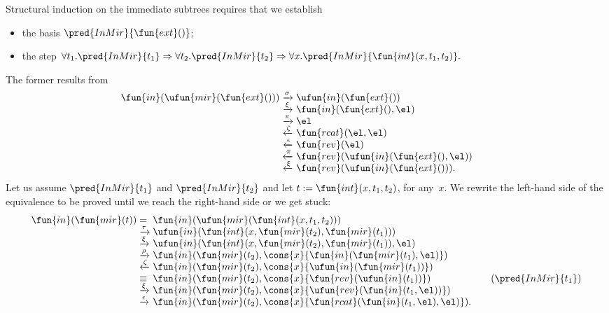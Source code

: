 \noindent Structural induction on the immediate subtrees requires that
we establish
\begin{itemize}

  \item the basis
  \(\pred{InMir}{\fun{ext}()}\);

  \item the step \(\forall t_1.\pred{InMir}{t_1} \Rightarrow \forall
    t_2.\pred{InMir}{t_2} \Rightarrow \forall
    x.\pred{InMir}{\fun{int}(x,t_1,t_2)}.\)

\end{itemize}
The former results from
\begin{equation*}
\begin{array}{@{}r@{\;}c@{\;}l@{\qquad}}
  \fun{in}(\ufun{mir}(\fun{ext}()))
  & \xrightarrow{\smash{\sigma}}
  & \ufun{in}(\fun{ext}())\\
  & \xrightarrow{\smash{\xi}}
  & \fun{in}(\fun{ext}(),\el)\\
  & \xrightarrow{\smash{\pi}}
  & \el\\
  & \xleftarrow{\smash{\zeta}}
  & \fun{rcat}(\el,\el)\\
  & \xleftarrow{\smash{\epsilon}}
  & \fun{rev}(\el)\\
  & \xleftarrow{\smash{\pi}}
  & \fun{rev}(\ufun{in}(\fun{ext}(),\el))\\
  & \xleftarrow{\smash{\xi}}
  & \fun{rev}(\ufun{in}(\fun{ext}())).
  \index{rcat@\fun{rcat/2}}\index{rev@\fun{rev/1}}
\end{array}
\end{equation*}
Let us assume \(\pred{InMir}{t_1}\) and \(\pred{InMir}{t_2}\) and let
\(t := \fun{int}(x,t_1,t_2)\), for any~\(x\). We rewrite the
left\hyp{}hand side of the equivalence to be proved until we reach the
right\hyp{}hand side or we get stuck:
\begin{equation*}
\begin{array}{@{}r@{\;}l@{\;}l@{\qquad}r@{}}
\fun{in}(\fun{mir}(t)) & = &
\fun{in}(\ufun{mir}(\fun{int}(x,t_1,t_2)))\\
& \xrightarrow{\smash{\tau}}
& \ufun{in}(\fun{int}(x,\fun{mir}(t_2),\fun{mir}(t_1)))\\
& \xrightarrow{\smash{\xi}}
& \ufun{in}(\fun{int}(x,\fun{mir}(t_2),\fun{mir}(t_1)),\el)\\
& \xrightarrow{\smash{\rho}}
& \fun{in}(\fun{mir}(t_2),\cons{x}{\fun{in}(\fun{mir}(t_1),\el)})\\
& \xleftarrow{\smash{\zeta}}
& \fun{in}(\fun{mir}(t_2),\cons{x}{\ufun{in}(\fun{mir}(t_1))})\\
& \equiv
& \fun{in}(\fun{mir}(t_2),\cons{x}{\fun{rev}(\ufun{in}(t_1))})
& (\pred{InMir}{t_1})\\
& \xrightarrow{\smash{\xi}}
& \fun{in}(\fun{mir}(t_2),\cons{x}{\ufun{rev}(\fun{in}(t_1,\el))})\\
& \xrightarrow{\smash{\epsilon}}
& \fun{in}(\fun{mir}(t_2),\cons{x}{\fun{rcat}(\fun{in}(t_1,\el),\el)}).
\end{array}
\end{equation*}
